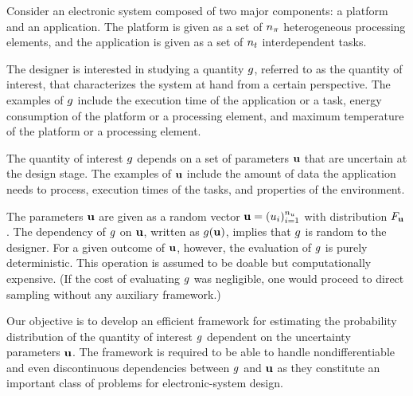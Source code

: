 Consider an electronic system composed of two major components: a platform and
an application. The platform is given as a set of ${n_\pi}$ heterogeneous processing
elements, and the application is given as a set of ${n_t}$ interdependent tasks.

The designer is interested in studying a quantity $g$, referred to as the
quantity of interest, that characterizes the system at hand from a certain
perspective. The examples of $g$ include the execution time of the application
or a task, energy consumption of the platform or a processing element, and
maximum temperature of the platform or a processing element.

The quantity of interest $g$ depends on a set of parameters $\mathbf{u}$ that are
uncertain at the design stage. The examples of $\mathbf{u}$ include the amount of data
the application needs to process, execution times of the tasks, and properties
of the environment.

The parameters $\mathbf{u}$ are given as a random vector $\mathbf{u} = (u_i)_{i = 1}^{n_u}$
with distribution $F_{\mathbf{u}}$. The dependency of $g$ on $\mathbf{u}$, written
as $g(\mathbf{u})$, implies that $g$ is random to the designer. For a given outcome
of $\mathbf{u}$, however, the evaluation of $g$ is purely deterministic. This
operation is assumed to be doable but computationally expensive. (If the cost of
evaluating $g$ was negligible, one would proceed to direct sampling without any
auxiliary framework.)

Our objective is to develop an efficient framework for estimating the
probability distribution of the quantity of interest $g$ dependent on the
uncertainty parameters $\mathbf{u}$. The framework is required to be able to handle
nondifferentiable and even discontinuous dependencies between $g$ and $\mathbf{u}$ as
they constitute an important class of problems for electronic-system design.
